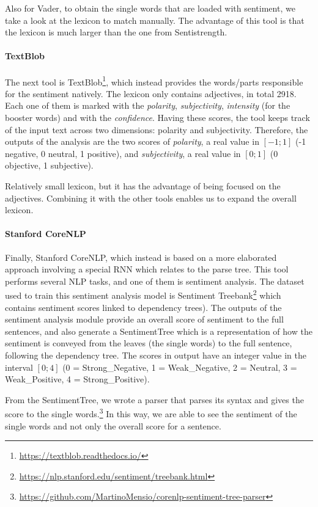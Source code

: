 Also for Vader, to obtain the single words that are loaded with sentiment, we take a look at the lexicon to match manually. The advantage of this tool is that the lexicon is much larger than the one from Sentistrength.



\paragraph{TextBlob}
The next tool is TextBlob\footnote{\url{ https://textblob.readthedocs.io/}}, which instead provides the words/parts responsible for the sentiment natively.
The lexicon only contains adjectives, in total 2918. Each one of them is marked with the \emph{polarity}, \emph{subjectivity}, \emph{intensity} (for the booster words) and with the \emph{confidence}. Having these scores, the tool keeps track of the input text across two dimensions: polarity and subjectivity.
Therefore, the outputs of the analysis are the two scores of \emph{polarity}, a real value in $[-1;1]$ (-1 negative, 0 neutral, 1 positive), and \emph{subjectivity}, a real value in $[0;1]$ (0 objective, 1 subjective).

Relatively small lexicon, but it has the advantage of being focused on the adjectives. Combining it with the other tools enables us to expand the overall lexicon.


\paragraph{Stanford CoreNLP}
Finally, Stanford CoreNLP, which instead is based on a more elaborated approach involving a special RNN which relates to the parse tree. This tool performs several NLP tasks, and one of them is sentiment analysis.
The dataset used to train this sentiment analysis model is Sentiment Treebank\footnote{\url{https://nlp.stanford.edu/sentiment/treebank.html}} which contains sentiment scores linked to dependency trees).
The outputs of the sentiment analysis module provide an overall score of sentiment to the full sentences, and also generate a SentimentTree which is a representation of how the sentiment is conveyed from the leaves (the single words) to the full sentence, following the dependency tree.
The scores in output have an integer value in the interval $[0;4]$ (0 = Strong\_Negative, 1 = Weak\_Negative, 2 = Neutral, 3 = Weak\_Positive, 4 = Strong\_Positive).

From the SentimentTree, we wrote a parser that parses its syntax and gives the score to the single words.\footnote{\url{https://github.com/MartinoMensio/corenlp-sentiment-tree-parser}}
In this way, we are able to see the sentiment of the single words and not only the overall score for a sentence.


